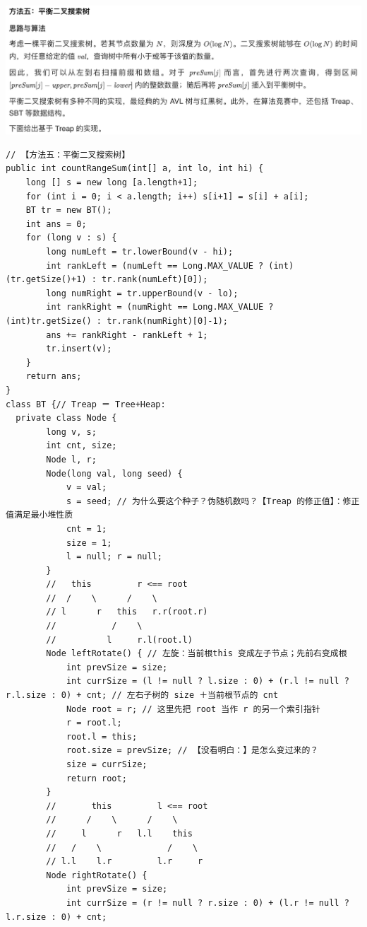 \documentclass[9pt, b5paaper]{book}
\begin{document}
\begin{enumerate}
\includegraphics[width=.9\linewidth]{./pic/segmentTree_20230414_142718.png}

\begin{verbatim}
// 【方法五：平衡二叉搜索树】
public int countRangeSum(int[] a, int lo, int hi) {
    long [] s = new long [a.length+1];
    for (int i = 0; i < a.length; i++) s[i+1] = s[i] + a[i];
    BT tr = new BT();
    int ans = 0;
    for (long v : s) {
        long numLeft = tr.lowerBound(v - hi);
        int rankLeft = (numLeft == Long.MAX_VALUE ? (int)(tr.getSize()+1) : tr.rank(numLeft)[0]);
        long numRight = tr.upperBound(v - lo);
        int rankRight = (numRight == Long.MAX_VALUE ? (int)tr.getSize() : tr.rank(numRight)[0]-1);
        ans += rankRight - rankLeft + 1;
        tr.insert(v);
    }
    return ans;
}
class BT {// Treap ＝ Tree+Heap: 
  private class Node {
        long v, s;
        int cnt, size;
        Node l, r;
        Node(long val, long seed) {
            v = val;
            s = seed; // 为什么要这个种子？伪随机数吗？【Treap 的修正值】：修正值满足最小堆性质
            cnt = 1;
            size = 1;
            l = null; r = null;
        }
        //   this         r <== root
        //  /    \      /    \
        // l      r   this   r.r(root.r)
        //           /    \
        //          l     r.l(root.l)
        Node leftRotate() { // 左旋：当前根this 变成左子节点；先前右变成根
            int prevSize = size;
            int currSize = (l != null ? l.size : 0) + (r.l != null ? r.l.size : 0) + cnt; // 左右子树的 size ＋当前根节点的 cnt
            Node root = r; // 这里先把 root 当作 r 的另一个索引指针
            r = root.l;
            root.l = this;
            root.size = prevSize; // 【没看明白：】是怎么变过来的？
            size = currSize;
            return root;
        }
        //       this         l <== root
        //      /    \      /    \
        //     l      r   l.l    this
        //   /    \             /    \
        // l.l    l.r         l.r     r
        Node rightRotate() {
            int prevSize = size;
            int currSize = (r != null ? r.size : 0) + (l.r != null ? l.r.size : 0) + cnt;

\end{verbatim}
\end{enumerate}
\end{document}
